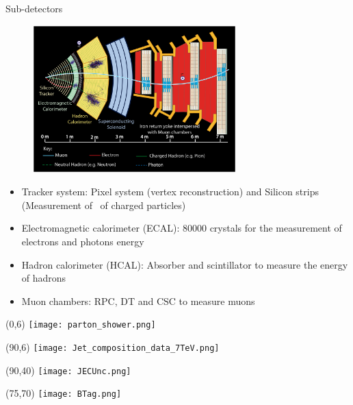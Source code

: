 \begin{frame}{Sub-detectors}
\vspace{-.2cm}
\begin{figure}[!Hhtbp]
  \begin{center}
    \includegraphics[width=0.7\textwidth]{../figs/PictureforPoint5_oct04_allp.jpg}
  \end{center}
\end{figure}
\vspace{-.4cm}
\begin{block}{}
\begin{itemize}\tiny
\item Tracker system: Pixel system (vertex reconstruction) and Silicon strips (Measurement of \pt~of charged particles)
\item Electromagnetic calorimeter (ECAL): 80000 crystals for the measurement of electrons and photons energy
\item Hadron calorimeter (HCAL): Absorber and scintillator to measure the energy of hadrons
\item Muon chambers: RPC, DT and CSC to measure muons \pt
\end{itemize}
\end{block}

\end{frame}


\begin{frame}{}
\vspace{-.2cm}

\begin{textblock}{95}(0,6)
    \texttt{[image: parton\_shower.png]}
\end{textblock}
\begin{textblock}{35}(90,6)
\texttt{[image: Jet\_composition\_data\_7TeV.png]}
\end{textblock}
\begin{textblock}{30}(90,40)
\texttt{[image: JECUnc.png]}
\end{textblock}
\begin{textblock}{50}(75,70)
\texttt{[image: BTag.png]}
\end{textblock}

\end{frame}



